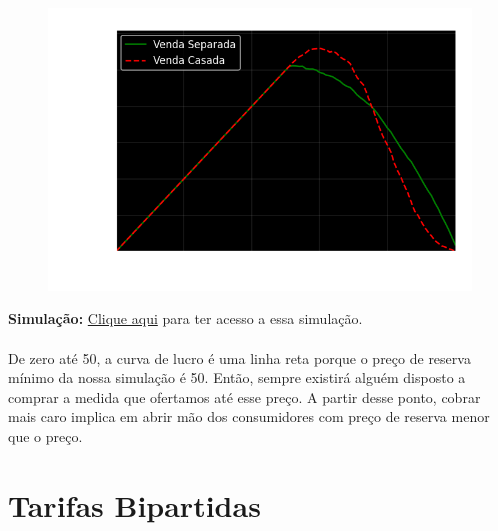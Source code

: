 \documentclass[a4paper,11pt,oneside]{book}
\theoremstyle{definition}
\theoremstyle{break}
\begin{document}
\begin{figure}[H]
\centering
\includegraphics[scale=0.8]{cap26_5-venda_casada.png}
\end{figure}

\textbf{Simulação:} \href{https://drive.google.com/file/d/1WhxGaAhUB9dKkgrKWadihIrzS4cm3bXP/view?usp=sharing}{Clique aqui} para ter acesso a essa simulação.
\\~\\
De zero até 50, a curva de lucro é uma linha reta porque o preço de reserva mínimo da nossa simulação é 50. Então, sempre existirá alguém disposto a comprar a medida que ofertamos até esse preço. A partir desse ponto, cobrar mais caro implica em abrir mão dos consumidores com preço de reserva menor que o preço.

\section{Tarifas Bipartidas}
\end{document}
